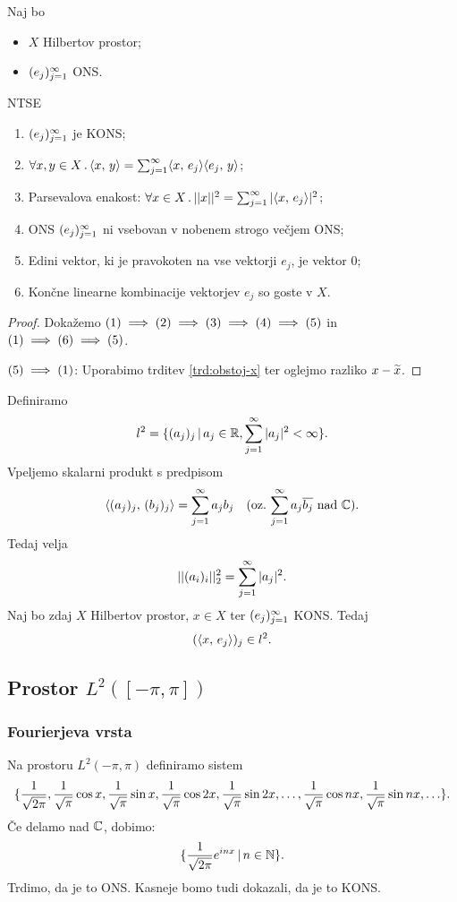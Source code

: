 \begin{izrek}
    \label{izr:parsevalova-enakost}
    Naj bo 
    \begin{itemize}
        \item \(X\) Hilbertov prostor;
        \item \((e_j)_{j=1}^\infty\) ONS.
    \end{itemize}
    NTSE 
    \begin{enumerate}
        \item \((e_j)_{j=1}^\infty\) je KONS;
        \item \(\forall x, y \in X \,.\, \langle x, \, y \rangle = \sum_{j=1}^{\infty} \langle x, \, e_j \rangle \langle e_j, \, y \rangle\);
        \item Parsevalova enakost: \(\forall x \in X \,.\, ||x||^2 = \sum_{j=1}^{\infty} |\langle x, \, e_j \rangle|^2\);
        \item ONS \((e_j)_{j=1}^\infty\) ni vsebovan v nobenem strogo večjem ONS;
        \item Edini vektor, ki je pravokoten na vse vektorji \(e_j\), je vektor \(0\);
        \item Končne linearne kombinacije vektorjev \(e_j\) so goste v \(X\).
    \end{enumerate}
\end{izrek}

\begin{proof}
    Dokažemo \((1) \implies (2) \implies (3) \implies (4) \implies (5)\) in \((1) \implies (6) \implies (5)\).
    
    \((5) \implies (1)\): Uporabimo trditev \ref{trd:obstoj-x} ter oglejmo razliko \(x - \widetilde{x}\).
\end{proof}

\begin{zgled}
    Definiramo 
    \[l^2 = \{(a_j)_j \,|\, a_j \in \mathbb{R}, \sum_{j=1}^{\infty} |a_j|^2 < \infty\}.\]
    Vpeljemo skalarni produkt s predpisom 
    \[\langle (a_j)_j, \, (b_j)_j \rangle = \sum_{j=1}^{\infty}a_jb_j \quad \text{(oz.}\, \sum_{j=1}^{\infty}a_j\overline{b_j} \ \text{nad}\ \mathbb{C}).\]
    Tedaj velja 
    \[||(a_i)_i||_2^2 = \sum_{j=1}^{\infty}|a_j|^2.\]
    Naj bo zdaj \(X\) Hilbertov prostor, \(x \in X\) ter \((e_j)_{j=1}^\infty\) KONS. Tedaj 
    \[(\langle x, \, e_j \rangle)_j \in l^2.\]
\end{zgled}

\newpage
\subsection{Prostor \(L^2([-\pi, \pi])\)}
\subsubsection{Fourierjeva vrsta}
Na prostoru \(L^2(-\pi, \pi)\) definiramo sistem 
\[
    \{\frac{1}{\sqrt{2\pi}}, \frac{1}{\sqrt{\pi}} \cos x, \frac{1}{\sqrt{\pi}} \sin x, \frac{1}{\sqrt{\pi}} \cos 2x, \frac{1}{\sqrt{\pi}} \sin 2x, \ldots, \frac{1}{\sqrt{\pi}} \cos nx, \frac{1}{\sqrt{\pi}} \sin nx, \ldots\}.
\]
Če delamo nad \(\mathbb{C}\), dobimo:
\[
    \{\frac{1}{\sqrt{2\pi}} e^{inx} \,|\, n \in \mathbb{N}\}.
\]
Trdimo, da je to ONS. Kasneje bomo tudi dokazali, da je to KONS.


